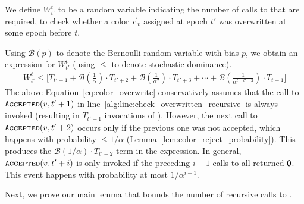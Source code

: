 \begin{definition}
\label{def:blah}
We define $W^t_{t'}$ to be a random variable indicating the number of calls to  that are required,
to check whether a color $\vec c_v$ assigned at epoch $t'$ was overwritten at some epoch before $t$.
\end{definition}
Using $\mathcal B(p)$ to denote the Bernoulli random variable with bias $p$, we obtain an expression for $W^t_{t'}$
(using $\le$ to denote stochastic dominance).
\begin{align}
\label{eq:color_overwrite}
W^t_{t'} \le
\Biggl[T_{t'+1} + \mathcal B\left(\frac{1}{\alpha}\right)\cdot T_{t'+2}
+ \mathcal B\left(\frac{1}{\alpha^2}\right)\cdot T_{t'+3} + \cdots
+ \mathcal B\left(\frac{1}{\alpha^{t-t'-2}}\right)\cdot T_{t-1} \Biggr]
\end{align}
The above Equation~\ref{eq:color_overwrite} conservatively assumes that the call to $\texttt{\textsc{Accepted}}(v, t'+1)$
in line~\ref{alg:line:check_overwritten_recursive} is always invoked (resulting in $T_{t'+1}$ invocations of ).
However, the next call to $\texttt{\textsc{Accepted}}(v, t'+2)$ occurs only if the previous one was not accepted,
which happens with probability $\le 1/\alpha$ (Lemma~\ref{lem:color_reject_probability}).
This produces the $\mathcal B(1/\alpha)\cdot T_{t'+2}$ term in the expression.
In general, $\texttt{\textsc{Accepted}}(v, t'+i)$ is only invoked if the preceding $i-1$ calls to  all returned $\mathsf{0}$.
This event happens with probability at most $1/\alpha^{i-1}$.

Next, we prove our main lemma that bounds the number of recursive calls to .

